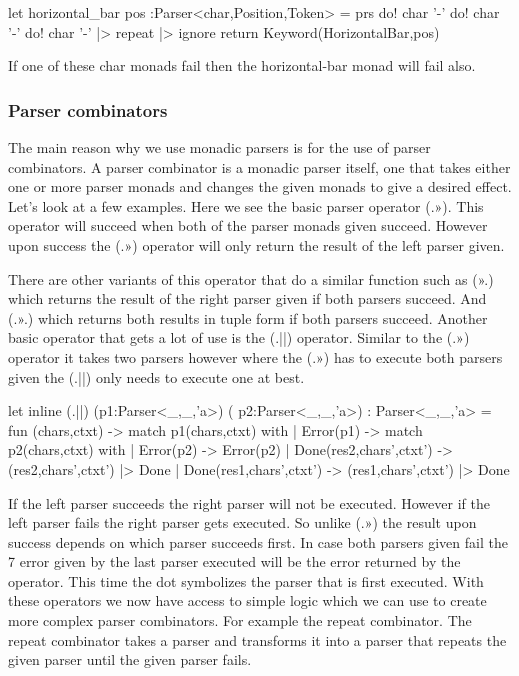 \begin{code}
	let horizontal_bar pos :Parser<char,Position,Token> = 
		prs{ 
			do! char '-' 
			do! char '-' 
			do! char '-' |> repeat |> ignore 
			return Keyword(HorizontalBar,pos) 
		}
\end{code}

If one of these char monads fail then the horizontal-bar monad will fail also. 

\subsubsection{Parser combinators}

The main reason why we use monadic parsers is for the use of parser combinators. A parser combinator is a monadic parser itself, one that takes either one or more parser monads and changes the given monads to give a desired effect. Let’s look at a few examples. 
\linebreak
Here we see the basic parser operator (.»). This operator will succeed when both of the parser monads given succeed. However upon success the (.») operator will only return the result of the left parser given. 

\begin{code}
	let (.>>) (l) (r) = 
		prs{ 
			let! res = P1 
			do! P2 
			return res 
		} 
	} 
	char ‘(’a) .>> char ‘(’b)
\end{code}

There are other variants of this operator that do a similar function such as (».) which returns the result of the right parser given if both parsers succeed. And (.».) which returns both results in tuple form if both parsers succeed. 
\linebreak
Another basic operator that gets a lot of use is the (.||) operator. Similar to the (.») operator it takes two parsers however where the (.») has to execute both parsers given the (.||) only needs to execute one at best.

\begin{code}
	let inline (.||) (p1:Parser<_,_,'a>) ( p2:Parser<_,_,'a>) : Parser<_,_,'a> = 
		fun (chars,ctxt) -> 
		match p1(chars,ctxt) with 
		| Error(p1) -> 
			match p2(chars,ctxt) with 
			| Error(p2) -> Error(p2) 
			| Done(res2,chars',ctxt') -> (res2,chars',ctxt') |> Done 
		| Done(res1,chars',ctxt') -> (res1,chars',ctxt') |> Done
\end{code}

If the left parser succeeds the right parser will not be executed. However if the left parser fails the right parser gets executed. So unlike (.») the result upon success depends on which parser succeeds first. In case both parsers given fail the 7 error given by the last parser executed will be the error returned by the operator. 
\linebreak
This time the dot symbolizes the parser that is first executed. With these operators we now have access to simple logic which we can use to create more complex parser combinators. 
\linebreak
For example the repeat combinator. The repeat combinator takes a parser and transforms it into a parser that repeats the given parser until the given parser fails.

